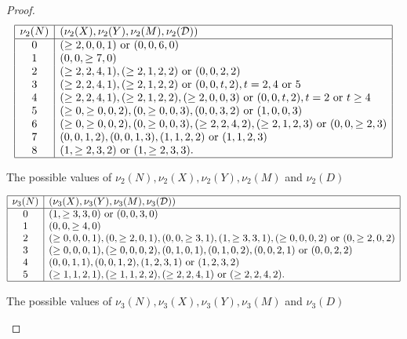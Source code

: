 \begin{proof}
\begin{table}[h]
$$
\begin{array}{|c|l|} \hline
\nu_2 (N) & (\nu_2 (X), \nu_2 (Y), \nu_2 (M), \nu_2 (\mathcal{D}) ) \\ \hline
0 &  (\geq 2, 0, 0, 1)  \mbox{ or } (0,0,6, 0)  \\
1 & (0,0,\geq 7, 0)  \\
2 & (\geq 2, 2, 4, 1), (\geq 2, 1, 2, 2) \mbox{ or } (0,0,2, 2) \\
3 & (\geq 2, 2, 4, 1), (\geq 2, 1, 2, 2)  \mbox{ or }  (0,0,t, 2), t= 2, 4 \mbox{ or } 5  \\
4 &  (\geq 2, 2, 4, 1), (\geq 2, 1, 2, 2), (\geq 2, 0, 0, 3)  \mbox{ or }  (0,0,t, 2), t= 2 \mbox{ or } t \geq 4  \\
5 & (\geq 0, \geq 0, 0, 2), (0, \geq 0, 0, 3), (0,0,3, 2) \mbox{ or } (1,0,0, 3)  \\
6 & (\geq 0, \geq 0, 0, 2), (0, \geq 0, 0, 3), (\geq 2, 2, 4, 2), (\geq 2, 1, 2, 3) \mbox{ or }  (0,0,\geq 2, 3) \\
7 & (0,0,1,2), (0,0,1,3), (1,1,2,2) \mbox{ or } (1,1,2,3) \\
8 & (1, \geq 2, 3, 2) \mbox{ or } (1, \geq 2, 3, 3). \\
 \hline
\end{array}
$$
\caption{The possible values of $\nu_2(N), \nu_2 (X), \nu_2 (Y), \nu_2(M)$ and $\nu_2 (D)$}
\label{tab nu2 nxym}
\end{table}

\begin{table}[h]
$$
\begin{array}{|c|l|} \hline
\nu_3 (N) & (\nu_3 (X), \nu_3 (Y), \nu_3 (M), \nu_3 (\mathcal{D}) ) \\ \hline
0 & (1, \geq 3, 3, 0)  \mbox{ or } (0,0,3, 0)  \\
1 & (0,0,\geq 4, 0)  \\
2 & (\geq 0, 0, 0, 1), (0, \geq 2, 0, 1), (0,0, \geq 3, 1), (1, \geq 3, 3, 1), (\geq 0,0,0,2) 
\mbox{ or } (0,\geq 2, 0, 2)  \\
3 & (\geq 0, 0, 0, 1),  (\geq 0, 0, 0, 2), (0,1,0, 1), (0,1,0, 2), (0,0,2,1) \mbox{ or } (0,0,2, 2) \\
4 &  (0,0,1,1), (0,0,1,2), (1,2,3,1) \mbox{ or } (1, 2, 3, 2) \\
5 &   (\geq 1, 1, 2, 1), (\geq 1, 1, 2, 2), (\geq 2, 2, 4, 1) \mbox{ or }  (\geq 2, 2, 4,2). \\
 \hline
\end{array}
$$
\caption{The possible values of $\nu_3(N), \nu_3(X), \nu_3 (Y), \nu_3(M)$ and $\nu_3 (D)$}
\label{tab nu3 nxym}
\end{table}


\end{proof}
